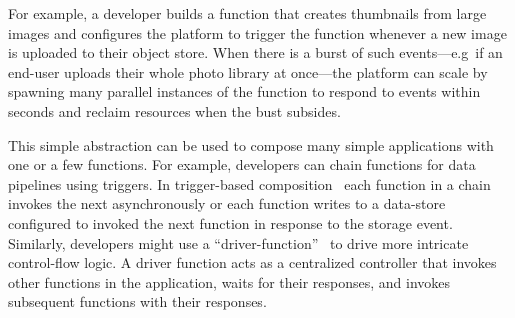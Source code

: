 For example, a developer builds a function that creates thumbnails from large
images and configures the platform to trigger the function whenever a new image
is uploaded to their object store. When there is a burst of such events---e.g\
if an end-user uploads their whole photo library at once---the platform can
scale by spawning many parallel instances of the function to respond to events
within seconds and reclaim resources when the bust subsides.

This simple abstraction can be used to compose many simple applications with
one or a few functions. For example, developers can chain functions for data
pipelines using triggers. In trigger-based composition~\cite{netherite} each
function in a chain invokes the next asynchronously or each function writes to
a data-store configured to invoked the next function in response to the
storage event. Similarly, developers might use a
``driver-function''~\cite{beldi} to drive more intricate control-flow logic. A
driver function acts as a centralized controller that invokes other functions
in the application, waits for their responses, and invokes subsequent
functions with their responses.

